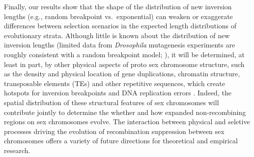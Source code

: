 \documentclass{article}[12pt]
\newcommand\hl[1]{%
  \bgroup
  \hskip0pt\color{blue!80!black}%
  #1%
  \egroup
}
\begin{document}
Finally, our results show that the shape of the distribution of new inversion lengths (e.g., random breakpoint vs.~exponential) can weaken or exaggerate differences between selection scenarios in the expected length distributions of evolutionary strata. Although little is known about the distribution of new inversion lengths (limited data from {\itshape Drosophila} mutagenesis experiments are roughly consistent with a random breakpoint model; \citealt{KrimbasPowell1992}), it will be determined, at least in part, by other physical aspects of proto sex chromosome structure, such as the density and physical location of gene duplications, chromatin structure, transposable elements (TEs) and other repetitive sequences, which create hotspots for inversion breakpoints and DNA replication errors \citep[e.g.,][]{Charlesworth1994, PevznerTesler2003, PengPevznerTesler2006, LeeBatzer2008}. Indeed, the spatial distribution of these structural features of sex chromosomes will contribute jointly to determine the whether and how expanded non-recombining regions on sex chromosomes evolve. The interaction between physical and seletive processes driving the evolution of recombination suppression between sex chromosomes offers a variety of future directions for theoretical and empirical research.






\end{document}
